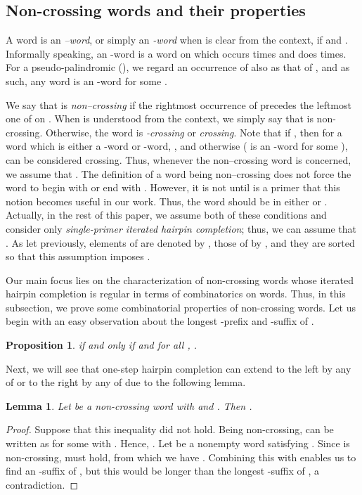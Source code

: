 \documentclass{article}
\theoremstyle{plain}
\newtheorem{lemma}{Lemma}
\newtheorem{proposition}{Proposition}
\theoremstyle{remark}
\begin{document}
\subsection{Non-crossing words and their properties}



A word  is an {\it --word}, or simply an {\it -word} when  is clear from the context, if  and . 
Informally speaking, an -word is a word on which  occurs  times and  does  times. 
For a pseudo-palindromic  (), we regard an occurrence of  also as that of , and as such, any word is an -word for some . 

We say that  is {\it non--crossing} if the rightmost occurrence of  precedes the leftmost one of  on . 
When  is understood from the context, we simply say that  is non-crossing. 
Otherwise, the word is {\it -crossing} or {\it crossing}. 
Note that if , then for a word  which is either a -word or -word, , and otherwise ( is an -word for some ),  can be considered crossing. 
Thus, whenever the non--crossing word is concerned, we assume that . 
The definition of a word being non--crossing does not force the word to begin with  or end with . 
However, it is not until  is a primer that this notion becomes useful in our work. 
Thus, the word should be in either  or . 
Actually, in the rest of this paper, we assume both of these conditions and consider only {\it single-primer iterated hairpin completion}; thus, we can assume that . 
As let previously, elements of  are denoted by , those of  by , and they are sorted so that this assumption imposes . 

Our main focus lies on the characterization of non-crossing words whose iterated hairpin completion is regular in terms of combinatorics on words. 
Thus, in this subsection, we prove some combinatorial properties of non-crossing words. 
Let us begin with an easy observation about the longest -prefix and -suffix of . 

\begin{proposition}\label{prop:mirror}
	 if and only if  and for all , . 
\end{proposition}

Next, we will see that one-step hairpin completion can extend  to the left by any of  or to the right by any of  due to the following lemma. 

\begin{lemma}\label{lem:length_nonoverlap_apref_casuf}
	Let  be a non-crossing word with  and . 
	Then . 
\end{lemma}
\begin{proof}
	Suppose that this inequality did not hold. 
	Being non-crossing,  can be written as  for some  with . 
	Hence, . 
	Let  be a nonempty word satisfying . 
	Since  is non-crossing,  must hold, from which we have . 
	Combining this with  enables us to find an -suffix  of , but this would be longer than the longest -suffix of , a contradiction. 
\end{proof}
\end{document}
